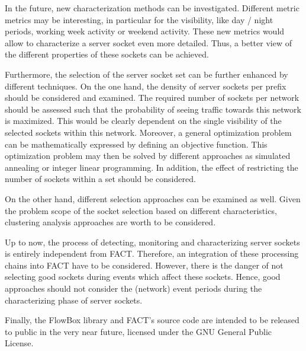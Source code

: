 In the future, new characterization methods can be investigated. 
Different metric metrics may be interesting, in particular for the visibility, like day / night periods, working week activity or weekend activity.
These new metrics would allow to characterize a \gls{server socket} even more detailed.
Thus, a better view of the different properties of these sockets can be achieved. 

Furthermore, the selection of the \gls{server socket} set can be further enhanced by different techniques.
On the one hand, the density of \glspl{server socket} per prefix should be considered and examined.
The required number of sockets per network should be assessed such that the probability of seeing traffic towards this network is maximized.
This would be clearly dependent on the single visibility of the selected sockets within this network.
Moreover, a general optimization problem can be mathematically expressed by defining an objective function.
This optimization problem may then be solved by different approaches as simulated annealing or integer linear programming.
In addition, the effect of restricting the number of sockets within a set should be considered. 

On the other hand, different selection approaches can be examined as well.
Given the problem scope of the socket selection based on different characteristics, clustering analysis approaches are worth to be considered. 

Up to now, the process of detecting, monitoring and characterizing \glspl{server socket} is entirely independent from \gls{FACT}. Therefore, an integration of these processing chains into \gls{FACT} have to be considered. 
However, there is the danger of not selecting good sockets during events which affect these sockets.
Hence, good approaches should not consider the (network) event periods during the characterizing phase of \glspl{server socket}.

Finally, the FlowBox library and \gls{FACT}'s source code are intended to be released to public in the very near future, licensed under the GNU General Public License.